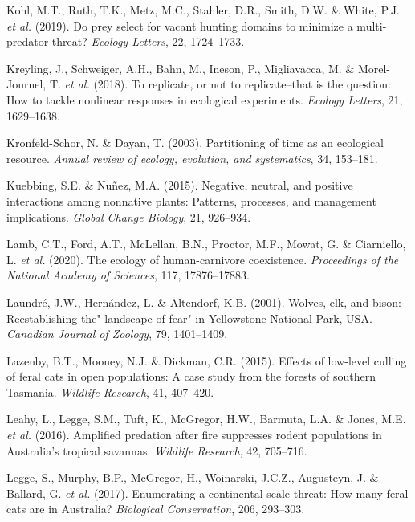 \documentclass[11pt,a4paper,titlepage,twoside,openright]{style/unimelbthesis}
\begin{document}
\begin{mainmatter}
\leavevmode\hypertarget{ref-kohl2019prey}{}%
Kohl, M.T., Ruth, T.K., Metz, M.C., Stahler, D.R., Smith, D.W. \& White, P.J. \emph{et al.} (2019). Do prey select for vacant hunting domains to minimize a multi-predator threat? \emph{Ecology Letters}, 22, 1724--1733.

\leavevmode\hypertarget{ref-kreyling2018replicate}{}%
Kreyling, J., Schweiger, A.H., Bahn, M., Ineson, P., Migliavacca, M. \& Morel-Journel, T. \emph{et al.} (2018). To replicate, or not to replicate--that is the question: How to tackle nonlinear responses in ecological experiments. \emph{Ecology Letters}, 21, 1629--1638.

\leavevmode\hypertarget{ref-kronfeld2003partitioning}{}%
Kronfeld-Schor, N. \& Dayan, T. (2003). Partitioning of time as an ecological resource. \emph{Annual review of ecology, evolution, and systematics}, 34, 153--181.

\leavevmode\hypertarget{ref-kuebbing2015negative}{}%
Kuebbing, S.E. \& Nuñez, M.A. (2015). Negative, neutral, and positive interactions among nonnative plants: Patterns, processes, and management implications. \emph{Global Change Biology}, 21, 926--934.

\leavevmode\hypertarget{ref-lamb2020ecology}{}%
Lamb, C.T., Ford, A.T., McLellan, B.N., Proctor, M.F., Mowat, G. \& Ciarniello, L. \emph{et al.} (2020). The ecology of human-carnivore coexistence. \emph{Proceedings of the National Academy of Sciences}, 117, 17876--17883.

\leavevmode\hypertarget{ref-laundre2001wolves}{}%
Laundré, J.W., Hernández, L. \& Altendorf, K.B. (2001). Wolves, elk, and bison: Reestablishing the" landscape of fear" in Yellowstone National Park, USA. \emph{Canadian Journal of Zoology}, 79, 1401--1409.

\leavevmode\hypertarget{ref-lazenby2015effects}{}%
Lazenby, B.T., Mooney, N.J. \& Dickman, C.R. (2015). Effects of low-level culling of feral cats in open populations: A case study from the forests of southern Tasmania. \emph{Wildlife Research}, 41, 407--420.

\leavevmode\hypertarget{ref-leahy2016amplified}{}%
Leahy, L., Legge, S.M., Tuft, K., McGregor, H.W., Barmuta, L.A. \& Jones, M.E. \emph{et al.} (2016). Amplified predation after fire suppresses rodent populations in Australia's tropical savannas. \emph{Wildlife Research}, 42, 705--716.

\leavevmode\hypertarget{ref-legge2017enumerating}{}%
Legge, S., Murphy, B.P., McGregor, H., Woinarski, J.C.Z., Augusteyn, J. \& Ballard, G. \emph{et al.} (2017). Enumerating a continental-scale threat: How many feral cats are in Australia? \emph{Biological Conservation}, 206, 293--303.


\end{mainmatter}
\end{document}
